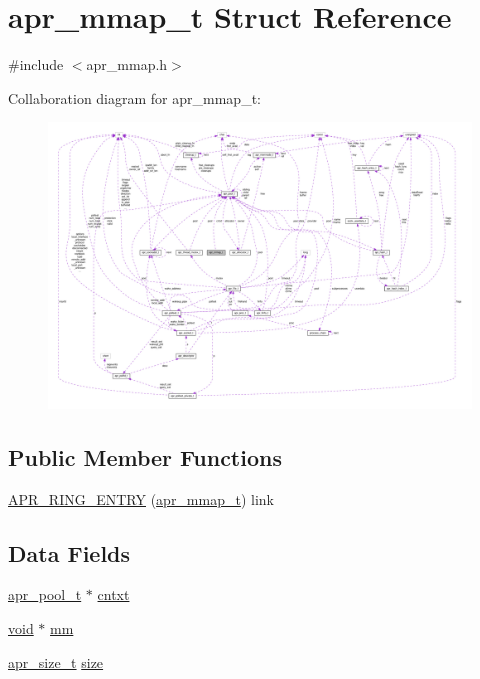 \hypertarget{structapr__mmap__t}{}\section{apr\+\_\+mmap\+\_\+t Struct Reference}
\label{structapr__mmap__t}


{\ttfamily \#include $<$apr\+\_\+mmap.\+h$>$}



Collaboration diagram for apr\+\_\+mmap\+\_\+t\+:
\nopagebreak
\begin{figure}[H]
\begin{center}
\leavevmode
\includegraphics[width=350pt]{structapr__mmap__t__coll__graph}
\end{center}
\end{figure}
\subsection*{Public Member Functions}
\begin{DoxyCompactItemize}
\item 
\hyperlink{structapr__mmap__t_aeca30aed7539548d31b7c0115020af62}{A\+P\+R\+\_\+\+R\+I\+N\+G\+\_\+\+E\+N\+T\+RY} (\hyperlink{structapr__mmap__t}{apr\+\_\+mmap\+\_\+t}) link
\end{DoxyCompactItemize}
\subsection*{Data Fields}
\begin{DoxyCompactItemize}
\item 
\hyperlink{structapr__pool__t}{apr\+\_\+pool\+\_\+t} $\ast$ \hyperlink{structapr__mmap__t_a42d01080278bbc9bad26728f9a71c492}{cntxt}
\item 
\hyperlink{group__MOD__ISAPI_gacd6cdbf73df3d9eed42fa493d9b621a6}{void} $\ast$ \hyperlink{structapr__mmap__t_abcc62d7e7c8187311e6619faf0d44f19}{mm}
\item 
\hyperlink{group__apr__platform_gaaa72b2253f6f3032cefea5712a27540e}{apr\+\_\+size\+\_\+t} \hyperlink{structapr__mmap__t_a274aea0906a4b674e1642ac9e81966c7}{size}
\end{DoxyCompactItemize}


